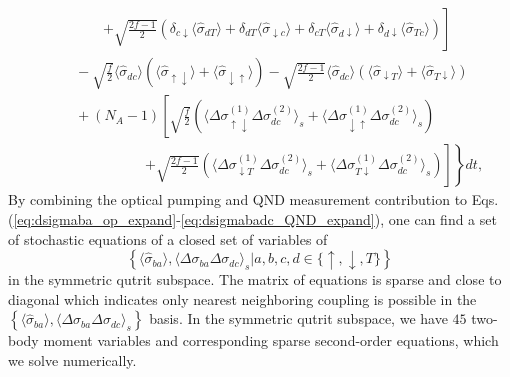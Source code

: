 \documentclass[preprint,aps,pra,onecolumn,superscriptaddress]{revtex4-1} %
\newcommand{\nn}{\nonumber}
\newcommand{\expect}[1]{\big\langle #1 \big\rangle}
\begin{document}
\begin{appendix}
\begin{align}
&\quad\quad\quad\quad\left. +\sqrt{\frac{2f-1}{2}}\left(\delta_{c\downarrow}\expect{\hat{\sigma}_{dT}} + \delta_{dT}\expect{\hat{\sigma}_{\downarrow c} }+\delta_{cT}\expect{\hat{\sigma}_{d\downarrow} } +\delta_{d\downarrow}\expect{\hat{\sigma}_{Tc} } \right)\right] \nn\\
&\quad\quad -\sqrt{\frac{f}{2}}\expect{\hat{\sigma}_{dc} }\left(\expect{\hat{\sigma}_{\uparrow\downarrow} }+\expect{\hat{\sigma}_{\downarrow\uparrow} } \right) -\sqrt{\frac{2f-1}{2}} \expect{\hat{\sigma}_{dc}}\left(\expect{\hat{\sigma}_{\downarrow T}}+\expect{\hat{\sigma}_{T\downarrow}} \right)\nn\\
&\quad\quad + (N_A-1)\left[ \sqrt{\frac{f}{2}} \left(\expect{\Delta\sigma_{\uparrow\downarrow}^{(1)}\Delta\sigma_{dc}^{(2)}}_s \!+\!\expect{\Delta\sigma_{\downarrow\uparrow}^{(1)}\Delta \sigma_{dc}^{(2)}}_s\right)\right. \nn\\
&\quad\quad\quad\quad\quad\quad\quad\left.\left. + \sqrt{\frac{2f\!-\! 1}{2}}\left(\expect{\!\Delta \sigma_{\downarrow T}^{(\!1\!)}\Delta\sigma_{dc}^{(\!2\!)}}_s \!+\!\expect{\!\Delta\sigma_{T\downarrow}^{(\! 1\! )} \Delta \sigma_{dc}^{(\!2\!)} }_s\right)\!\right]\!  \right\}dt,\label{eq:dsigmabadc_QND_expand}
\end{align}
By combining the optical pumping and QND measurement contribution to Eqs. (\ref{eq:dsigmaba_op_expand}-\ref{eq:dsigmabadc_QND_expand}), one can find a set of stochastic equations of a closed set of variables of 
\begin{equation}
\left\{\expect{\hat{\sigma}_{ba}},\expect{\Delta\sigma_{ba}\Delta\sigma_{dc} }_s\left|a,b,c,d\in \{\uparrow,\downarrow,T \}\right. \right\} 
\end{equation}
in the symmetric qutrit subspace. 
The matrix of equations is sparse and close to diagonal which indicates only nearest neighboring coupling is possible in the $\left\{\expect{\hat{\sigma}_{ba}},\expect{\Delta\sigma_{ba}\Delta\sigma_{dc} }_s\right\}$ basis. 
In the symmetric qutrit subspace, we have $ 45 $ two-body moment variables and corresponding sparse second-order equations, which we solve numerically. 


\end{appendix}
\end{document}
